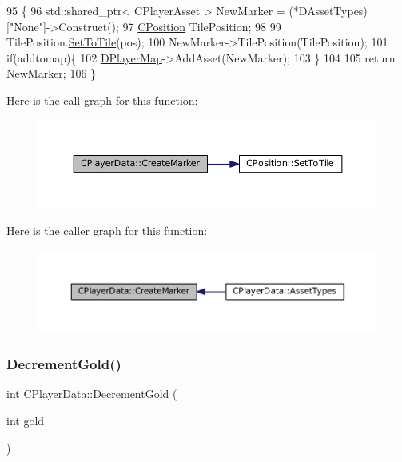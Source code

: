 \begin{DoxyCode}
95                                                                                           \{
96     std::shared\_ptr< CPlayerAsset > NewMarker = (*DAssetTypes)[\textcolor{stringliteral}{"None"}]->Construct();
97     \hyperlink{classCPosition}{CPosition} TilePosition;
98     
99     TilePosition.\hyperlink{classCPosition_ae302aa21792de64c97de29e2cbbfeb94}{SetToTile}(pos);
100     NewMarker->TilePosition(TilePosition);
101     \textcolor{keywordflow}{if}(addtomap)\{
102         \hyperlink{classCPlayerData_a452163191cd4603e1e38dd8d4bb9691c}{DPlayerMap}->AddAsset(NewMarker);
103     \}
104     
105     \textcolor{keywordflow}{return} NewMarker;
106 \}
\end{DoxyCode}
Here is the call graph for this function\+:\nopagebreak
\begin{figure}[H]
\begin{center}
\leavevmode
\includegraphics[width=350pt]{classCPlayerData_a4ef7c98c3b0f28354a2bccc2782b57ad_cgraph}
\end{center}
\end{figure}
Here is the caller graph for this function\+:\nopagebreak
\begin{figure}[H]
\begin{center}
\leavevmode
\includegraphics[width=350pt]{classCPlayerData_a4ef7c98c3b0f28354a2bccc2782b57ad_icgraph}
\end{center}
\end{figure}
\hypertarget{classCPlayerData_ac072cd77c60b35920a278aaffcefd3fd}{}\label{classCPlayerData_ac072cd77c60b35920a278aaffcefd3fd} 
\subsubsection{\texorpdfstring{Decrement\+Gold()}{DecrementGold()}}
{\footnotesize\ttfamily int C\+Player\+Data\+::\+Decrement\+Gold (\begin{DoxyParamCaption}\item[{int}]{gold }\end{DoxyParamCaption})\hspace{0.3cm}{\ttfamily [inline]}}



